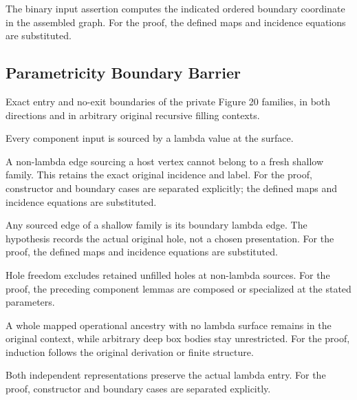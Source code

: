 The binary input assertion computes the indicated ordered boundary coordinate in the assembled graph.
For the proof, the defined maps and incidence equations are substituted.
\par{}

\subsection{Parametricity Boundary Barrier}
Exact entry and no-exit boundaries of the private Figure 20 families, in both directions and in arbitrary original recursive filling contexts.

Every component input is sourced by a lambda value at the surface.
\par{}

A non-lambda edge sourcing a host vertex cannot belong to a fresh shallow family. This retains the exact original incidence and label.
For the proof, constructor and boundary cases are separated explicitly; the defined maps and incidence equations are substituted.
\par{}

Any sourced edge of a shallow family is its boundary lambda edge. The hypothesis records the actual original hole, not a chosen presentation.
For the proof, the defined maps and incidence equations are substituted.
\par{}

Hole freedom excludes retained unfilled holes at non-lambda sources.
For the proof, the preceding component lemmas are composed or specialized at the stated parameters.
\par{}

A whole mapped operational ancestry with no lambda surface remains in the original context, while arbitrary deep box bodies stay unrestricted.
For the proof, induction follows the original derivation or finite structure.
\par{}

Both independent representations preserve the actual lambda entry.
For the proof, constructor and boundary cases are separated explicitly.
\par{}

